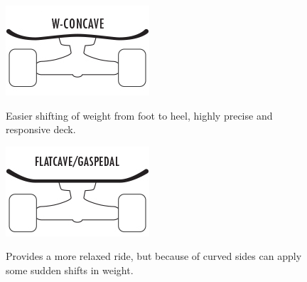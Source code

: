 \documentclass[letterpaper,12pt]{article}
\begin{document}
\begin{itemize}
\begin{figure}[!htbp]\centering
\begin{minipage}{.5\textwidth}\centering
\includegraphics[width=.8\textwidth]{w-concave.jpg}
\label{w-concave}
\end{minipage}
\item Easier shifting of weight from foot to heel, highly precise and responsive deck.
\end{figure}

\begin{figure}[!htbp]\centering
\begin{minipage}{.5\textwidth}\centering
\includegraphics[width=.8\textwidth]{flatcave.jpg}
\label{flatcave}
\end{minipage}
\item Provides a more relaxed ride, but because of curved sides can apply some sudden shifts in weight.
\end{figure}


\end{itemize}
\end{document}
